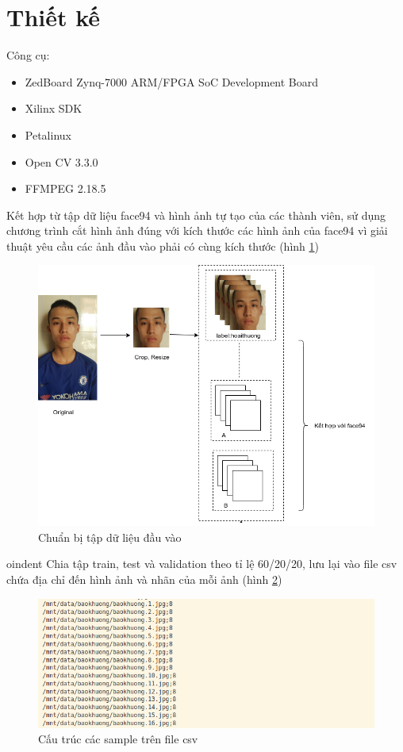 \documentclass[a4paper]{report}
\begin{document}
\section{Thiết kế}
Công cụ:
\begin{itemize}
\item ZedBoard Zynq-7000 ARM/FPGA SoC Development Board
\item Xilinx SDK 
\item Petalinux 
\item Open CV 3.3.0 
\item FFMPEG 2.18.5
\end{itemize}
Kết hợp từ tập dữ liệu face94 và hình ảnh tự tạo của các thành viên, sử dụng chương trình cắt hình ảnh đúng với kích thước các hình ảnh của face94 vì giải thuật yêu cầu các ảnh đầu vào phải có cùng kích thước (hình \ref{fig:thietke2})
%
\begin{figure}[H]
\centering
\includegraphics[scale=.5]{../images/fig/thietke2.png}
\caption{Chuẩn bị tập dữ liệu đầu vào}
\label{fig:thietke2}
\end{figure}
%
oindent
Chia tập train, test và validation theo tỉ lệ 60/20/20, lưu lại vào file csv chứa địa chỉ đến hình ảnh và nhãn của mỗi ảnh (hình \ref{csv})
%
\begin{figure}[H]
\centering
\includegraphics[scale=.5]{../images/fig/csv.png}
\caption{Cấu trúc các sample trên file csv}
\label{csv}
\end{figure}
\end{document}
